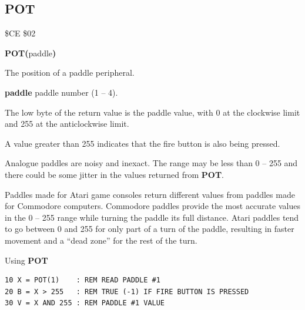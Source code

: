 \subsection{POT}
\begin{description}[leftmargin=2cm,style=nextline]
\item [Token:]    \$CE \$02

\item [Format:]   {\bf POT(}paddle{\bf)}

\item [Returns:]  The position of a paddle peripheral.

                  {\bf paddle} paddle number (1 -- 4).

                  The low byte of the return value is the paddle value, with 0 at the clockwise limit and 255 at the anticlockwise limit.

                  A value greater than 255 indicates that the fire button is also being pressed.

\item [Remarks:]  Analogue paddles are noisy and inexact. The range may be less than 0 -- 255 and there could be some jitter in the values returned from {\bf POT}.

                  Paddles made for Atari game consoles return different values from paddles made for Commodore computers. Commodore paddles provide the most accurate values in the 0 -- 255 range while turning the paddle its full distance. Atari paddles tend to go between 0 and 255 for only part of a turn of the paddle, resulting in faster movement and a ``dead zone'' for the rest of the turn.

\item [Example:]  Using {\bf POT}

\begin{tcolorbox}[colback=black,coltext=white]
\verbatimfont{\codefont}
\begin{verbatim}
10 X = POT(1)    : REM READ PADDLE #1
20 B = X > 255   : REM TRUE (-1) IF FIRE BUTTON IS PRESSED
30 V = X AND 255 : REM PADDLE #1 VALUE
\end{verbatim}
\end{tcolorbox}
\end{description}


\newpage
